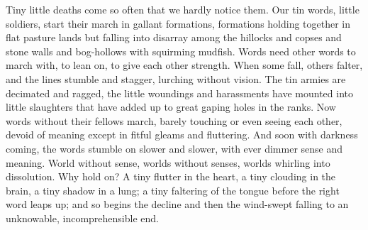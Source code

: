 
Tiny little deaths come so often that we hardly notice them. Our tin
words, little soldiers, start their march in gallant formations,
formations holding together in flat pasture lands but falling into
disarray among the hillocks and copses and stone walls and bog-hollows
with squirming mudfish. Words need other words to march with, to lean
on, to give each other strength. When some fall, others falter, and the
lines stumble and stagger, lurching without vision. The tin armies are
decimated and ragged, the little woundings and harassments have mounted
into little slaughters that have added up to great gaping holes in the
ranks. Now words without their fellows march, barely touching or even
seeing each other, devoid of meaning except in fitful gleams and
fluttering. And soon with darkness coming, the words stumble on slower
and slower, with ever dimmer sense and meaning. World without sense,
worlds without senses, worlds whirling into dissolution. Why hold on? A
tiny flutter in the heart, a tiny clouding in the brain, a tiny shadow
in a lung; a tiny faltering of the tongue before the right word leaps
up; and so begins the decline and then the wind-swept falling to an
unknowable, incomprehensible end.
